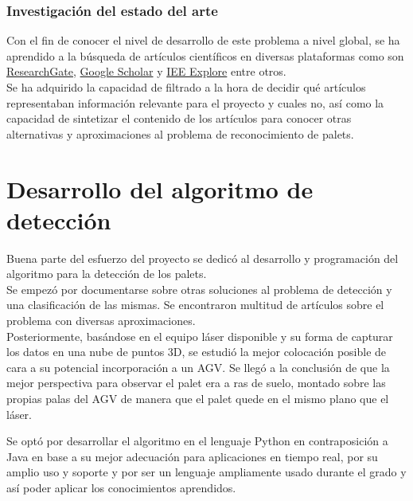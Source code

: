 		\subsubsection{Investigación del estado del arte}
			Con el fin de conocer el nivel de desarrollo de este problema a nivel global,  se ha aprendido a la búsqueda de artículos científicos en diversas plataformas como son \href{https://www.researchgate.net/}{ResearchGate}, \href{https://scholar.google.es/}{Google Scholar} y \href {https://ieeexplore.ieee.org/Xplore/home.jsp}{IEE Explore} entre otros.\\
Se ha adquirido la capacidad de filtrado a la hora de decidir qué artículos representaban información relevante para el proyecto y cuales no, así como la capacidad de sintetizar el contenido de los artículos para conocer otras alternativas y aproximaciones al problema de reconocimiento de palets.\\



			
			

\section{Desarrollo del algoritmo de detección}
		Buena parte del esfuerzo del proyecto se dedicó al desarrollo y programación del algoritmo para la detección de los palets.\\
		Se empezó por documentarse sobre otras soluciones al problema de detección y una clasificación de las mismas. Se encontraron multitud de artículos sobre el problema con diversas aproximaciones. \\ Posteriormente, basándose en el equipo láser disponible y su forma de capturar los datos en una nube de puntos 3D, se estudió la mejor colocación posible de cara a su potencial incorporación a un AGV. Se llegó a la conclusión de que la mejor perspectiva para observar el palet era a ras de suelo, montado sobre las propias palas del AGV de manera que el palet quede en el mismo plano que el láser. \\

		Se optó por desarrollar el algoritmo en el lenguaje Python en contraposición a Java en base a su mejor adecuación para aplicaciones en tiempo real, por su amplio uso y soporte y por ser un lenguaje ampliamente usado durante el grado y así poder aplicar los conocimientos aprendidos.\\

